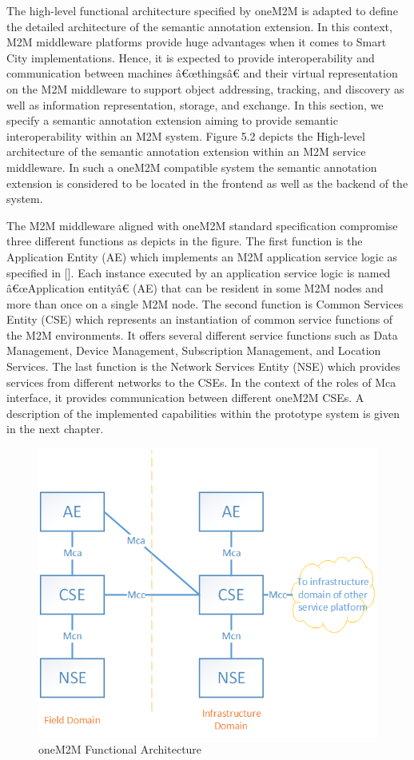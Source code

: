 The high-level functional architecture specified by oneM2M is adapted to define the detailed architecture of the semantic annotation extension. In this context, M2M middleware platforms provide huge advantages when it comes to Smart City implementations. Hence, it is expected to provide interoperability and communication between machines â€œthingsâ€ and their virtual representation on the M2M middleware to support object addressing, tracking, and discovery as well as information representation, storage, and exchange. In this section, we specify a semantic annotation extension aiming to provide semantic interoperability within an M2M system. Figure 5.2 depicts the High-level architecture of the semantic annotation extension within an M2M service middleware. In such a oneM2M compatible system the semantic annotation extension is considered to be located in the frontend as well as the backend of the system. \par
The M2M middleware aligned with oneM2M standard specification compromise three different functions as depicts in the figure. The first function is the Application Entity (AE) which implements an M2M application service logic as specified in []. Each instance executed by an application service logic is named â€œApplication entityâ€ (AE) that can be resident in some M2M nodes and more than once on a single M2M node. The second function is Common Services Entity (CSE) which represents an instantiation of common service functions of the M2M environments. It offers several different service functions such as Data Management, Device Management, Subscription Management, and Location Services. The last function is the Network Services Entity (NSE) which provides services from different networks to the CSEs. In the context of the roles of Mca interface, it provides communication between different oneM2M CSEs. A description of the implemented capabilities within the prototype system is given in the next chapter. 
\par
\begin{figure}[htbp]
    \centering
    \includegraphics[width=.9\textwidth]{resources/images/arch}
    \caption{oneM2M Functional Architecture}\label{fig:contrib1:goal}
\end{figure}\par
